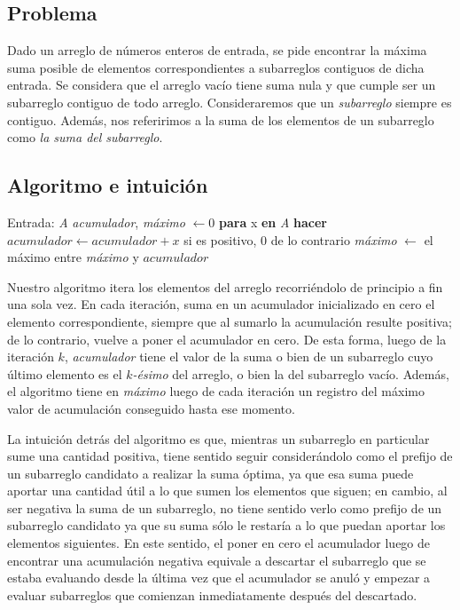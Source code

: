 \subsection{Problema}
Dado un arreglo de números enteros de entrada, se pide encontrar la máxima suma posible de elementos correspondientes a subarreglos contiguos de dicha entrada. Se considera que el arreglo vacío tiene suma nula y que cumple ser un subarreglo contiguo de todo arreglo. Consideraremos que un \textit{subarreglo} siempre es contiguo. Además, nos referirimos a la suma de los elementos de un subarreglo como \textit{la suma del subarreglo}.

\subsection{Algoritmo e intuición}

\noindent Entrada: \textit{A} \newline
\textit{acumulador}, \textit{máximo} $\leftarrow 0$ \newline
\textbf{para} x \textbf{en} \textit{A} \textbf{hacer} \newline
\indent $\mathit{acumulador} \leftarrow \mathit{acumulador + x}$ si es positivo, $0$ de lo contrario \newline
\indent \textit{máximo} $\leftarrow$ el máximo entre \textit{máximo} y $\mathit{acumulador}$

\bigskip

Nuestro algoritmo itera los elementos del arreglo recorriéndolo de principio a fin una sola vez. En cada iteración, suma en un acumulador inicializado en cero el elemento correspondiente, siempre que al sumarlo la acumulación resulte positiva; de lo contrario, vuelve a poner el acumulador en cero. De esta forma, luego de la iteración $k$, \textit{acumulador} tiene el valor de la suma o bien de un subarreglo cuyo último elemento es el $k$\textit{-ésimo} del arreglo, o bien la del subarreglo vacío. Además, el algoritmo tiene en \textit{máximo} luego de cada iteración un registro del máximo valor de acumulación conseguido hasta ese momento.

La intuición detrás del algoritmo es que, mientras un subarreglo en particular sume una cantidad positiva, tiene sentido seguir considerándolo como el prefijo de un subarreglo candidato a realizar la suma óptima, ya que esa suma puede aportar una cantidad útil a lo que sumen los elementos que siguen; en cambio, al ser negativa la suma de un subarreglo, no tiene sentido verlo como prefijo de un subarreglo candidato ya que su suma sólo le restaría a lo que puedan aportar los elementos siguientes. En este sentido, el poner en cero el acumulador luego de encontrar una acumulación negativa equivale a descartar el subarreglo que se estaba evaluando desde la última vez que el acumulador se anuló y empezar a evaluar subarreglos que comienzan inmediatamente después del descartado.

